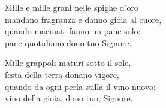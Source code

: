 
\strofa Mille e mille grani nelle spighe d'oro\\
mandano fragranza e danno gioia al cuore,\\
quando macinati fanno un pane solo:\\
pane quotidiano dono tuo Signore.

\spazio


\spazio

\strofa Mille grappoli maturi sotto il sole,\\
festa della terra donano vigore,\\
quando da ogni perla stilla il vino nuovo:\\
vino della gioia, dono tuo, Signore.

\spazio

